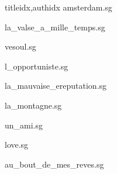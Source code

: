 \documentclass[12pt]{article}
\begin{document}
\begin{songs}{titleidx,authidx}
{amsterdam.sg}


{la_valse_a_mille_temps.sg}


{vesoul.sg}


{l_opportuniste.sg}


{la_mauvaise_ereputation.sg}


{la_montagne.sg}


{un_ami.sg}


{love.sg}


{au_bout_de_mes_reves.sg}



\end{songs}
\end{document}
